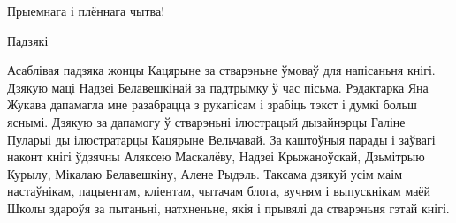 Прыемнага і плённага чытва!


Падзякі

Асаблівая падзяка жонцы Кацярыне за стварэньне ўмоваў для напісаньня кнігі. Дзякую маці Надзеі Белавешкінай за падтрымку ў час пісьма. Рэдактарка Яна Жукава дапамагла мне разабрацца з рукапісам і зрабіць тэкст і думкі больш яснымі. Дзякую за дапамогу ў стварэньні ілюстрацый дызайнэрцы Галіне Пуларыі ды ілюстратарцы Кацярыне Вельчавай. За каштоўныя парады і заўвагі наконт кнігі ўдзячны Аляксею Маскалёву, Надзеі Крыжаноўскай, Дзьмітрыю Курылу, Мікалаю Белавешкіну, Алене Рыдэль. Таксама дзякуй усім маім настаўнікам, пацыентам, кліентам, чытачам блога, вучням і выпускнікам маёй Школы здароўя за пытаньні, натхненьне, якія і прывялі да стварэньня гэтай кнігі.

 